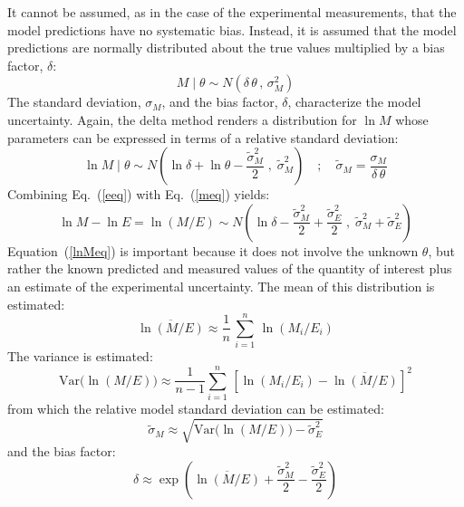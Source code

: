 \documentclass[fleqn,b5paper]{article}
\begin{document}
It cannot be assumed, as in the case of the experimental measurements, that the model predictions have no systematic bias. Instead, it is assumed that the model predictions are normally distributed about the true values multiplied by a bias factor, $\delta$:
\begin{equation}
   M \; | \; \theta \sim N \left(\delta \, \theta \, , \, \sigma_M^2 \right) \label{mdist}
\end{equation}
The standard deviation, $\sigma_M$, and the bias factor, $\delta$, characterize the model uncertainty. Again, the delta method renders a distribution for $\ln M$ whose parameters can be expressed in terms of a relative standard deviation:
\begin{equation}
   \ln M \; | \; \theta \sim N \left(\ln \delta +\ln \theta - \frac{\widetilde{\sigma}_M^2}{2} \; , \;
   \widetilde{\sigma}_M^2 \right) \quad ; \quad \widetilde{\sigma}_M=\frac{\sigma_M}{\delta \, \theta} \label{meq}
\end{equation}
Combining Eq.~(\ref{eeq}) with Eq.~(\ref{meq}) yields:
\begin{equation}
   \ln M  - \ln E = \ln(M/E) \sim N \left( \ln \delta - \frac{\widetilde{\sigma}_M^2}{2}+\frac{\widetilde{\sigma}_E^2}{2} \; ,
   \; \widetilde{\sigma}_M^2+\widetilde{\sigma}_E^2 \right) \label{lnMeq}
\end{equation}
Equation~(\ref{lnMeq}) is important because it does not involve the unknown $\theta$, but rather the known predicted and measured values of the quantity of interest plus an estimate of the experimental uncertainty. The mean of this distribution is estimated:
\begin{equation}
   \overline{\ln (M/E)} \approx \frac{1}{n} \, \sum_{i=1}^n \, \ln (M_i/E_i) 
\end{equation}
The variance is estimated:
\begin{equation}
   \mathrm{Var} \Big( \ln (M/E) \Big) \approx \frac{1}{n-1} \sum_{i=1}^n \, \left[ \ln (M_i/E_i) - \overline{\ln (M/E)}  \right]^2 \label{stdev}
\end{equation}
from which the relative model standard deviation can be estimated:
\begin{equation}
   \widetilde{\sigma}_M \approx \sqrt{ \mathrm{Var}\Big( \ln (M/E) \Big) - \widetilde{\sigma}_E^2 } \label{sig_M}
\end{equation}
and the bias factor:
\begin{equation}
   \delta \approx \exp \left( \overline{\ln (M/E)} + \frac{ \widetilde{\sigma}_M^2}{2}-\frac{\widetilde{\sigma}_E^2}{2} \right) \label{delta}
\end{equation}
\end{document}

